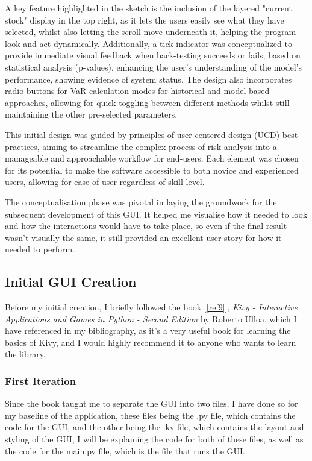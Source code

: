 \documentclass{article}
\begin{document}
A key feature highlighted in the sketch is the inclusion of the layered "current stock" display in the top right, as it lets the users easily see what they have selected, whilst also letting the scroll move underneath it, helping the program look and act dynamically. Additionally, a tick indicator was conceptualized to provide immediate visual feedback when back-testing succeeds or fails, based on statistical analysis (p-values), enhancing the user's understanding of the model's performance, showing evidence of system status. The design also incorporates radio buttons for VaR calculation modes for historical and model-based approaches, allowing for quick toggling between different methods whilst still maintaining the other pre-selected parameters.\\\vspace{0.3cm}

This initial design was guided by principles of user centered design (UCD) best practices, aiming to streamline the complex process of risk analysis into a manageable and approachable workflow for end-users. Each element was chosen for its potential to make the software accessible to both novice and experienced users, allowing for ease of user regardless of skill level.\\\vspace{0.3cm}

The conceptualisation phase was pivotal in laying the groundwork for the subsequent development of this GUI. It helped me visualise how it needed to look and how the interactions would have to take place, so even if the final result wasn't visually the same, it still provided an excellent user story for how it needed to perform.

\subsection{Initial GUI Creation}
Before my initial creation, I briefly followed the book [\ref{ref9}], \textit{Kivy - Interactive Applications and Games in Python - Second Edition} by Roberto Ulloa, which I have referenced in my bibliography, as it's a very useful book for learning the basics of Kivy, and I would highly recommend it to anyone who wants to learn the library.

\subsubsection{First Iteration}
Since the book taught me to separate the GUI into two files, I have done so for my baseline of the application, these files  being the .py file, which contains the code for the GUI, and the other being the .kv file, which contains the layout and styling of the GUI, I will be explaining the code for both of these files, as well as the code for the main.py file, which is the file that runs the GUI.\@\\\vspace{0.3cm}
\end{document}
